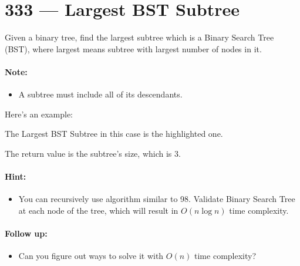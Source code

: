 \section{333 --- Largest BST Subtree}
Given a binary tree, find the largest subtree which is a Binary Search Tree (BST), where largest means subtree with largest number of nodes in it.
\paragraph{Note:}
\begin{itemize}
    \item A subtree must include all of its descendants. 
\end{itemize}
\par
Here's an example:
\begin{figure}[H]
\end{figure}
The Largest BST Subtree in this case is the highlighted one. 
\par
The return value is the subtree's size, which is 3.

\paragraph{Hint:}
\begin{itemize}
    \item You can recursively use algorithm similar to 98. Validate Binary Search Tree at each node of the tree, which will result in $O(n\log n)$ time complexity.
\end{itemize}

\paragraph{Follow up:}
\begin{itemize}
    \item Can you figure out ways to solve it with $O(n)$ time complexity?
\end{itemize}